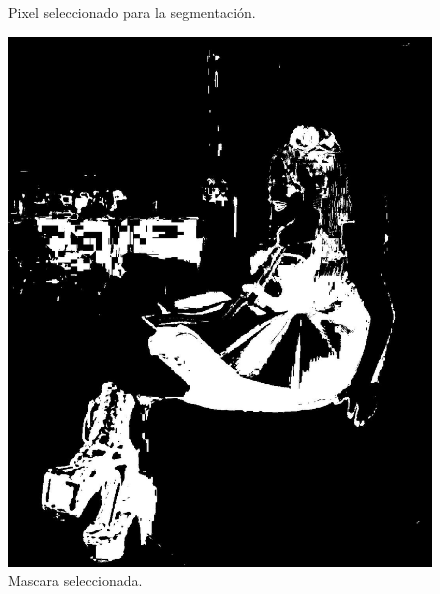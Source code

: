 \documentclass[11pt, letterpaper]{article}
\begin{document}
\begin{figure}[h!]
\begin{minipage}{0.4\textwidth}
		\caption*{Pixel seleccionado para la segmentación.}
	\end{minipage}
	
	\vspace{1em} %
	
	\begin{minipage}{0.4\textwidth}
		\centering
		\includegraphics[width=\textwidth]{IMG/R22.jpg}
		\caption*{Mascara seleccionada.}
	\end{minipage}\hfill
	\begin{minipage}{0.4\textwidth}
		\centering

\end{minipage}
\end{figure}
\end{document}
